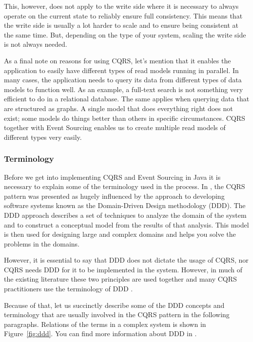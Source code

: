 \documentclass{book}
\begin{document}
This, however, does not apply to the write side where it is necessary to
always operate on the current state to reliably ensure full consistency.
This means that the write side is usually a lot harder to scale and to
ensure being consistent at the same time. But, depending on the type of
your system, scaling the write side is not always needed.

As a final note on reasons for using CQRS, let's mention that it enables
the application to easily have different types of read models running in
parallel. In many cases, the application needs to query its data from
different types of data models to function well. As an example, a
full-text search is not something very efficient to do in a relational
database. The same applies when querying data that are structured as
graphs. A single model that does everything right does not exist; some
models do things better than others in specific circumstances. CQRS
together with Event Sourcing enables us to create multiple read models
of different types very easily.

\subsubsection{Terminology}\label{terminology}

Before we get into implementing CQRS and Event Sourcing in Java it is
necessary to explain some of the terminology used in the process. In
\cite{journey}, the CQRS pattern was presented as hugely influenced by
the approach to developing software systems known as the Domain-Driven
Design methodology (DDD). The DDD approach describes a set of techniques
to analyze the domain of the system and to construct a conceptual model
from the results of that analysis. This model is then used for designing
large and complex domains and helps you solve the problems in the
domains.

However, it is essential to say that DDD does not dictate the usage of
CQRS, nor CQRS needs DDD for it to be implemented in the system.
However, in much of the existing literature these two principles are
used together and many CQRS practitioners use the terminology of DDD
\cite{journey}.

Because of that, let us succinctly describe some of the DDD concepts and
terminology that are usually involved in the CQRS pattern in the
following paragraphs. Relations of the terms in a complex system is
shown in Figure~\ref{fig:ddd}. You can find more information about DDD
in \cite{ddd}.
\end{document}
